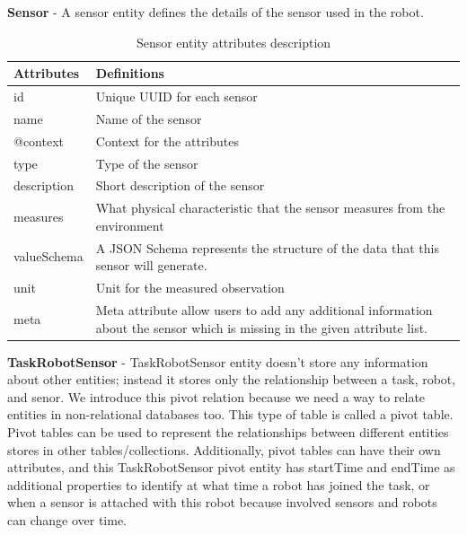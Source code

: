 	\textbf{Sensor} - A sensor entity defines the details of the sensor used in the robot.

	\begin{table}[!htbp]
		\begin{tabular}{|l|p{12cm}|}
			\hline
			\textbf{Attributes} & \textbf{Definitions} \\ \hline
			id & Unique UUID for each sensor \\ \hline
			name & Name of the sensor \\ \hline
			@context & Context for the attributes \\ \hline
			type & Type of the sensor \\ \hline
			description & Short description of the sensor \\ \hline
			measures & What physical characteristic that the sensor measures from the environment \\ \hline
			valueSchema & A JSON Schema represents the structure of the data that this sensor will generate. \\ \hline
			unit & Unit for the measured observation\\ \hline
			meta & Meta attribute allow users to add any additional information about the sensor which is missing in the given attribute list.\\ \hline
			
		\end{tabular}
		\caption{Sensor entity attributes description}
		\label{tab:sensor_entity}
	\end{table}
	
	\newpage
	\textbf{TaskRobotSensor} - TaskRobotSensor entity doesn't store any information about other entities; instead it stores only the relationship between a task, robot, and senor. We introduce this pivot relation because we need a way to relate entities in non-relational databases too. This type of table is called a pivot table. Pivot tables can be used to represent the relationships between different entities stores in other tables/collections. Additionally, pivot tables can have their own attributes, and this TaskRobotSensor pivot entity has startTime and endTime as additional properties to identify at what time a robot has joined the task, or when a sensor is attached with this robot because involved sensors and robots can change over time. 
	
